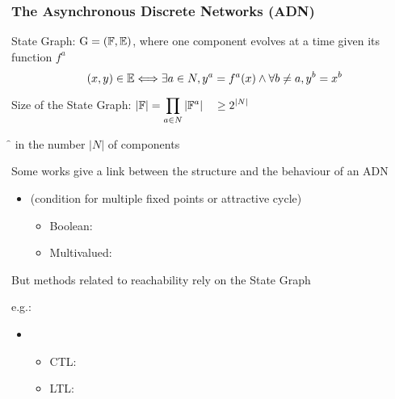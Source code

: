 \begin{frame}[c]
\begin{center}
\bigskip

\end{center}
\end{frame}



\begin{frame}[c]
  \frametitle{The Asynchronous Discrete Networks (ADN)}

State Graph: $\mathrm{G} = (\mathbb{F}, \mathbb{E})$, where one component evolves at a time given its function $f^a$
$$(x, y) \in \mathbb{E} \Longleftrightarrow \exists a \in N, y^a = f^a(x) \wedge \forall b \neq a, y^b = x^b$$


\pause
\medskip
Size of the State Graph: \quad $\displaystyle|\mathbb{F}| = \prod_{a \in N} |\mathbb{F}^a| \quad\geq 2^{|N|}$

\medskip
\f {} in the number $|N|$ of components

\pause
\bigskip
Some works give a link between the structure and the behaviour of an ADN
\begin{itemize}
  \item {} (condition for multiple fixed points or attractive cycle)
  \begin{itemize}
    \item Boolean: \tcite{\citeremy}
    \item Multivalued: \tcite{\citerichardcomet}
  \end{itemize}
\end{itemize}

\pause
\medskip
But methods related to reachability rely on the State Graph

e.g.: 
\begin{itemize}
  \item {}
  \begin{itemize}
    \item CTL: \tcite{\citesmbionet}
    \item LTL: \tcite{\citeito}
  \end{itemize}
\end{itemize}
\end{frame}

